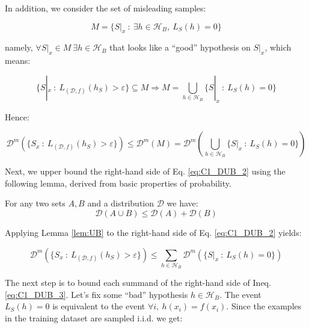 \documentclass[../../main/main.tex]{subfiles}
\begin{document}
In addition, we consider the set of misleading samples:

\begin{equation}
    M = \{ S|_x \ : \ \exists h \in \mathcal{H}_B, \ L_S(h) = 0 \}
    \label{eq:C1_MS}
\end{equation}

namely, \( \forall S|_x \in M \ \exists h \in \mathcal{H}_B \) that looks like a ``good'' hypothesis on \( S|_x \), which means:

\begin{equation}
    \{ S|_x \ : \ L_{(\mathcal{D},f)}(h_S) > \varepsilon \} \subseteq M
    \Longrightarrow
    M = \bigcup\limits_{h \in \mathcal{H}_B} \{ S|_x \ : \ L_S(h) = 0 \}
    \label{eq:C1_MS_2}
\end{equation}

Hence:

\begin{equation}
    \mathcal{D}^m (\{ S_x \ : \ L_{(\mathcal{D},f)}(h_S) > \varepsilon \})
    \le
    \mathcal{D}^m (M)
    =
    \mathcal{D}^m \left( \bigcup\limits_{h \in \mathcal{H}_B} \{ S|_x \ : \ L_S(h) = 0 \} \right)
    \label{eq:C1_DUB_2}
\end{equation}

Next, we upper bound the right-hand side of Eq. \ref{eq:C1_DUB_2} using the following lemma, derived from basic properties of probability.

\begin{lemma}
    \label{lem:UB}
    For any two sets \( A,B \) and a distribution \( \mathcal{D} \) we have:
    \begin{equation}
        \mathcal{D}(A \cup B) \le \mathcal{D}(A) + \mathcal{D}(B)
        \label{eq:C1_UBL}
    \end{equation}
\end{lemma}

Applying Lemma \ref{lem:UB} to the right-hand side of Eq. \ref{eq:C1_DUB_2} yields:

\begin{equation}
    \mathcal{D}^m (\{ S_x \ : \ L_{(\mathcal{D},f)}(h_S) > \varepsilon \})
    \le
    \sum_{h \in \mathcal{H}_B} \mathcal{D}^m (\{ S|_x \ : \ L_S(h) = 0 \})
    \label{eq:C1_DUB_3}
\end{equation}

The next step is to bound each summand of the right-hand side of Ineq. \ref{eq:C1_DUB_3}. Let's fix some ``bad'' hypothesis \( h \in \mathcal{H}_B \). The event \( L_S(h) = 0 \) is equivalent to the event \( \forall i, \ h(x_i) = f(x_i) \). Since the examples in the training dataset are sampled i.i.d. we get:
\end{document}
